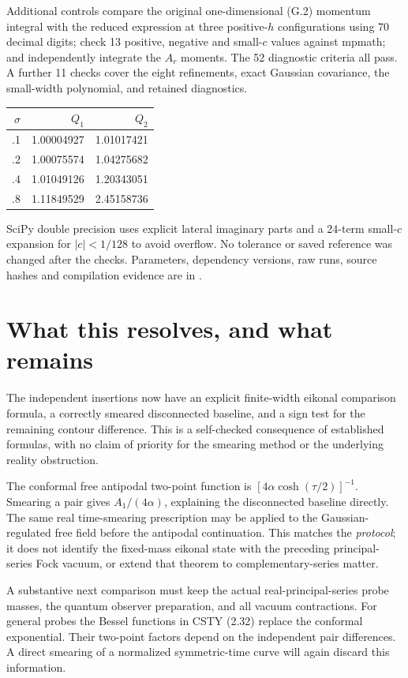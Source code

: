 \documentclass[11pt,a4paper]{article}
\begin{document}
Additional controls compare the original one-dimensional (G.2)
momentum integral with the reduced expression at three positive-$h$
configurations using 70 decimal digits; check 13 positive, negative
and small-$c$ values against mpmath; and independently integrate
the $A_r$ moments. The 52 diagnostic criteria all pass.
A further 11 checks cover the eight refinements, exact Gaussian
covariance, the small-width polynomial, and retained diagnostics.
\begin{center}
\begin{tabular}{rrr}
\toprule
$\sigma$ & $Q_1$ & $Q_2$\\
\midrule
.1 & 1.00004927 & 1.01017421\\
.2 & 1.00075574 & 1.04275682\\
.4 & 1.01049126 & 1.20343051\\
.8 & 1.11849529 & 2.45158736\\
\bottomrule
\end{tabular}
\end{center}
SciPy double precision uses explicit lateral imaginary parts and a
24-term small-$c$ expansion for $|c|<1/128$ to avoid overflow.
No tolerance or saved reference was changed after the checks.
Parameters, dependency versions, raw runs, source hashes and
compilation evidence are in .

\newpage
\section{What this resolves, and what remains}
The independent insertions now have an explicit finite-width
eikonal comparison formula, a correctly smeared disconnected
baseline, and a sign test for the remaining contour difference.
This is a self-checked consequence of established formulas, with
no claim of priority for the smearing method or the underlying
reality obstruction.

The conformal free antipodal two-point function is
$[4\alpha\cosh(\tau/2)]^{-1}$. Smearing a pair gives
$A_1/(4\alpha)$, explaining the disconnected baseline directly.
The same real time-smearing prescription may be applied to the
Gaussian-regulated free field before the antipodal continuation.
This matches the \emph{protocol}; it does not identify the fixed-mass
eikonal state with the preceding principal-series Fock vacuum,
or extend that theorem to complementary-series matter.

A substantive next comparison must keep the actual real-principal-series
probe masses, the quantum observer preparation, and all vacuum
contractions. For general probes the Bessel functions in CSTY (2.32)
replace the conformal exponential. Their two-point factors depend on
the independent pair differences. A direct smearing of a normalized
symmetric-time curve will again discard this information.
\end{document}
